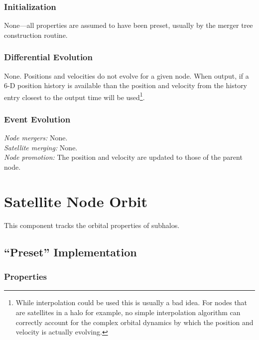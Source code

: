 \subsubsection{Initialization}

None---all properties are assumed to have been preset, usually by the merger tree construction routine.

\subsubsection{Differential Evolution}

None. Positions and velocities do not evolve for a given node. When output, if a 6-D position history is available than the position and velocity from the history entry closest to the output time will be used\footnote{While interpolation could be used this is usually a bad idea. For nodes that are satellites in a halo for example, no simple interpolation algorithm can correctly account for the complex orbital dynamics by which the position and velocity is actually evolving.}.

\subsubsection{Event Evolution}

\noindent\emph{Node mergers:} None.\\

\noindent\emph{Satellite merging:} None.\\

\noindent\emph{Node promotion:} The position and velocity are updated to those of the parent node.\\

\section{Satellite Node Orbit}

This component tracks the orbital properties of subhalos.

\subsection{``Preset'' Implementation}

\subsubsection{Properties}

